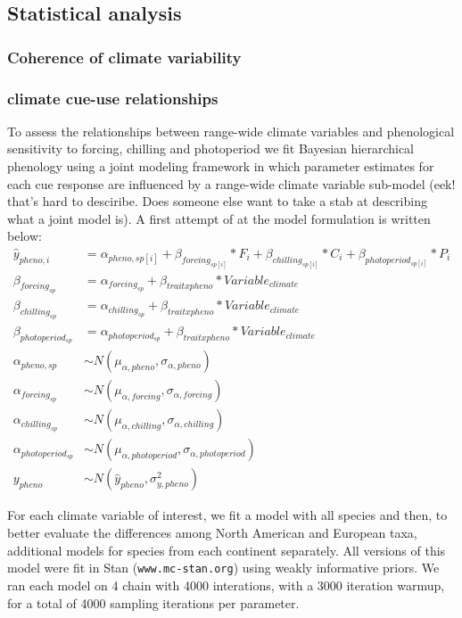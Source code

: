 \documentclass[12pt]{article}\usepackage[]{graphicx}\usepackage[]{color}
\begin{document}
\subsection*{Statistical analysis}
\subsubsection*{Coherence of climate variability}
\subsubsection*{climate cue-use relationships}
To assess the relationships between range-wide climate variables and phenological sensitivity to forcing, chilling and photoperiod we fit Bayesian hierarchical phenology using a joint modeling framework in which parameter estimates for each cue response are influenced by a range-wide climate variable sub-model (eek! that's hard to desciribe. Does someone else want to take a stab at describing what a joint model is). A first attempt of at the model formulation is written below:\\

\begin{align*}
\hat{y}_{pheno, i} &= \alpha_{pheno, sp[i]} + \beta_{forcing_{sp[i]}}*F_i+\beta_{chilling_{sp[i]}}*C_i+\beta_{photoperiod_{sp[i]}}*P_i \\
\beta_{forcing_{sp}} & = \alpha_{forcing_{sp}} + \beta_{trait x pheno}*Variable_{climate} \\
\beta_{chilling_{sp}} & = \alpha_{chilling_{sp}} + \beta_{trait x pheno}*Variable_{climate} \\
\beta_{photoperiod_{sp}} & = \alpha_{photoperiod_{sp}} + \beta_{trait x pheno}*Variable_{climate} \\
\alpha_{pheno, sp} & \sim N(\mu_{\alpha, pheno}, \sigma_{\alpha, pheno}) \\
\alpha_{forcing_{sp}} & \sim N(\mu_{\alpha, forcing}, \sigma_{\alpha, forcing})\\
\alpha_{chilling_{sp}} & \sim N(\mu_{\alpha, chilling}, \sigma_{\alpha, chilling})\\
\alpha_{photoperiod_{sp}} & \sim N(\mu_{\alpha, photoperiod}, \sigma_{\alpha, photoperiod})\\
y_{pheno} & \sim N(\hat{y}_{pheno},\sigma^2_{y, pheno}) 
\end{align*}

For each climate variable of interest, we fit a model with all species and then, to better evaluate the differences among North American and European taxa, additional models for species from each continent separately. All versions of this model were fit in Stan \citep{Carpenter2017}(\texttt{www.mc-stan.org}) using weakly informative priors. We ran each model on 4 chain with 4000 interations, with a 3000 iteration warmup, for a total of 4000 sampling iterations per parameter. 
\end{document}
